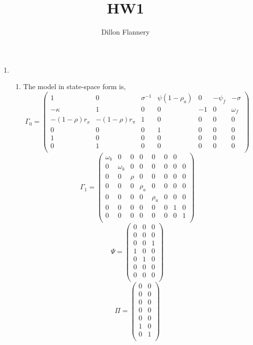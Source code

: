 \documentclass[]{article}
\title{HW1}
\author{Dillon Flannery}
\begin{document}
\maketitle
\begin{enumerate}
	\item 
	\begin{enumerate}
	\item The model in state-space form is, 
	\[  
	\Gamma_0=\begin{pmatrix}
	1 & 0 & \sigma^{-1} & \psi(1-\rho_a) & 0 & -\psi_f & -\sigma \\
	-\kappa & 1 & 0 & 0 & -1 & 0 & \omega_f \\ 
	-(1-\rho)r_x & -(1-\rho)r_{\pi} & 1 & 0 & 0 & 0& 0 \\
	0 & 0 & 0& 1 &  0 & 0 & 0 \\
	1 & 0 & 0 & 0& 0 & 0 & 0 \\
	0 & 1 & 0 & 0& 0 & 0 & 0 \\
	\end{pmatrix}
	\]
	\[
	\Gamma_1 = \begin{pmatrix}
	\omega_b &  0 & 0 & 0& 0 & 0 & 0 \\
	0 &  \omega_b & 0 & 0 & 0& 0 & 0 & 0 \\
	0 &  0 & \rho & 0 & 0& 0 & 0 & 0 \\
	0 &  0 & 0 & \rho_a & 0& 0 & 0 & 0 \\
	0 &  0 & 0 & 0 & \rho_u& 0 & 0 & 0 \\
	0 &  0 & 0 & 0 & 0& 0 & 1 & 0 \\
	0 &  0 & 0 & 0 & 0& 0 & 0 & 1 \\
	\end{pmatrix}
	  \]
	\[
	\Psi = \begin{pmatrix}
	0 & 0 & 0 \\
	0 & 0 & 0 \\
	0 & 0 & 1 \\
	1 & 0 & 0 \\
	0 & 1 & 0 \\
	0 & 0 & 0 \\
	0 & 0 & 0 \\
	\end{pmatrix}
	\]
	\[
	\Pi = \begin{pmatrix}
	0 & 0 \\
	0& 0 \\
0& 0 \\
0& 0 \\
0& 0 \\
1 & 0 \\
0 & 1 \\	

\end{pmatrix}\]
\end{enumerate}
\end{enumerate}
\end{document}
